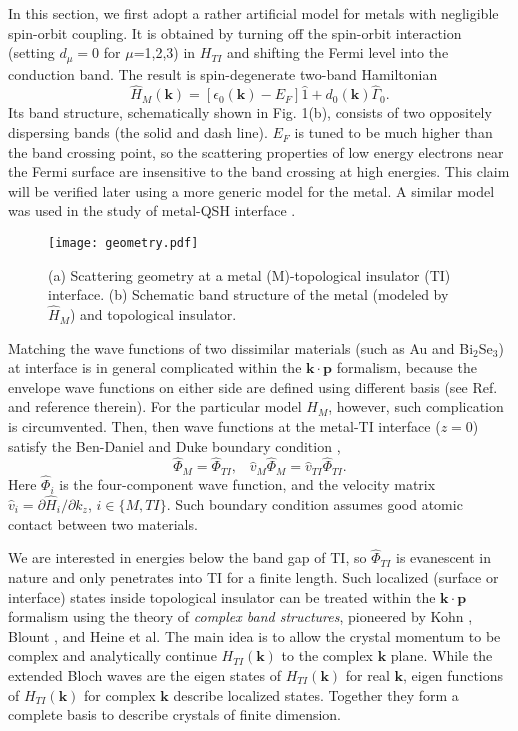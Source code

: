 \documentclass[11pt]{report}
\def\v#1{\mathbf{#1}}
\begin{document}
In this section, we first adopt a rather artificial model for metals with negligible 
spin-orbit coupling. It is
obtained by turning off the spin-orbit interaction (setting $d_\mu=0$ for $\mu$=1,2,3) 
in $H_{TI}$ and shifting the Fermi level into 
the conduction band. The result is spin-degenerate two-band Hamiltonian
\[
\hat{H}_M(\v{k})=[\epsilon_0(\v{k})-E_F]\hat{1}+d_0(\v{k})\hat{\Gamma}_0.
\]
Its band structure, schematically shown in Fig. 1(b), consists of two oppositely dispersing bands 
(the solid and dash line). $E_F$ is tuned to be much higher than the band crossing point, so
the scattering properties of low energy electrons near the Fermi surface are 
insensitive to the band crossing at high energies. This claim will be verified later using a
more generic model for the metal. A similar model was used in the study of metal-QSH interface \cite{yokoyama09}.


\begin{figure}
\texttt{[image: geometry.pdf]}
\caption{(a) Scattering geometry at a metal (M)-topological insulator (TI) interface.
(b) Schematic band structure of the metal (modeled by $\hat{H}_M$) and topological insulator.
}
\end{figure}


Matching the wave functions of two dissimilar 
materials (such as Au and Bi$_2$Se$_3$) at interface is in general 
complicated within the $\mathbf{k\cdot p}$ formalism, because the envelope wave functions 
on either side are defined using different basis (see Ref. \cite{bc} and reference therein). 
For the particular model $H_M$, however, such complication
is circumvented. Then, then wave functions at the metal-TI interface ($z=0$) satisfy the Ben-Daniel 
and Duke boundary condition \cite{duke}, 
\[
\hat{\Phi}_M=\hat{\Phi}_{TI}, \;\;\; \hat{v}_M \hat{\Phi}_M = \hat{v}_{TI}\hat{\Phi}_{TI}.
\]
Here $\hat{\Phi}_i$ is the four-component wave function, and 
the velocity matrix $\hat{v}_{i}=\partial \hat{H}_i/\partial k_z$, $i\in \{M, TI\}$. 
Such boundary condition assumes good atomic contact between two materials.

We are interested in energies below the band gap of TI, so 
$\hat{\Phi}_{TI}$ is evanescent in nature and only penetrates into TI 
for a finite length. Such localized (surface or interface) 
states inside topological insulator can be treated within the $\mathbf{k\cdot p}$ formalism 
using the theory of {\it complex band structures}, pioneered by Kohn \cite{kohn59}, Blount \cite{blount62}, 
and Heine \cite{heine63} et al. 
The main idea is to allow the crystal momentum to be complex and analytically continue
$H_{TI}(\v{k})$ to the complex $\v{k}$ plane. 
While the extended Bloch waves are the eigen states of $H_{TI}(\v{k})$ for real $\v{k}$, 
eigen functions of $H_{TI}(\v{k})$ for complex $\v{k}$ describe localized states. Together they
form a complete basis to describe crystals of finite dimension. 
\end{document}
